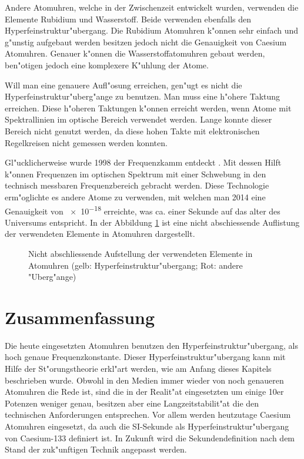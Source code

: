 \begin{refsection}
Andere Atomuhren, welche in der Zwischenzeit entwickelt wurden,
verwenden die Elemente Rubidium und Wasserstoff.  Beide verwenden
ebenfalls den Hyperfeinstruktur"ubergang.  Die Rubidium Atomuhren
k"onnen sehr einfach und g"unstig aufgebaut werden besitzen jedoch
nicht die Genauigkeit von Caesium Atomuhren.  Genauer k"onnen die
Wasserstoffatomuhren gebaut werden, ben"otigen jedoch eine komplexere
K"uhlung der Atome.

Will man eine genauere Aufl"osung erreichen, gen"ugt es nicht die
Hyperfeinstruktur"uberg"ange zu benutzen.  Man muss eine h"ohere
Taktung erreichen.  Diese h"oheren Taktungen k"onnen erreicht werden,
wenn Atome mit Spektrallinien im optische Bereich verwendet werden.
Lange konnte dieser Bereich nicht genutzt werden, da diese hohen
Takte mit elektronischen Regelkreisen nicht gemessen werden konnten.

Gl"ucklicherweise wurde 1998 der Frequenzkamm entdeckt
\cite{SdW:kamm}.  Mit dessen Hilft k"onnen Frequenzen im optischen
Spektrum mit einer Schwebung in den technisch messbaren
Frequenzbereich gebracht werden.  Diese Technologie erm"oglichte es
andere Atome zu verwenden, mit welchen man 2014 eine Genauigkeit von
\num{e-18} erreichte, was ca. einer Sekunde auf das alter des
Universums entspricht.  In der Abbildung \ref{fig:periode} ist eine
nicht abschiessende Auflistung der verwendeten Elemente in Atomuhren
dargestellt.

\begin{figure}
  \centering
  
  \caption{Nicht abschliessende Aufstellung der verwendeten Elemente
    in Atomuhren (gelb: Hyperfeinstruktur"ubergang; Rot: andere
    "Uberg"ange)}
  \label{fig:periode}
\end{figure}

\section{Zusammenfassung}
Die heute eingesetzten Atomuhren benutzen den
Hyperfeinstruktur"ubergang, als hoch genaue Frequenzkonstante.  Dieser
Hyperfeinstruktur"ubergang kann mit Hilfe der St"orungstheorie
erkl"art werden, wie am Anfang dieses Kapitels beschrieben wurde.
Obwohl in den Medien immer wieder von noch genaueren Atomuhren die
Rede ist, sind die in der Realit"at eingesetzten um einige 10er
Potenzen weniger genau, besitzen aber eine Langzeitstabilit"at die den
technischen Anforderungen entsprechen.  Vor allem werden heutzutage
Caesium Atomuhren eingesetzt, da auch die SI-Sekunde als
Hyperfeinstruktur"ubergang von Caesium-133 definiert ist.  In Zukunft
wird die Sekundendefinition nach dem Stand der zuk"unftigen Technik
angepasst werden.

\printbibliography[heading=subbibliography]
\end{refsection}

